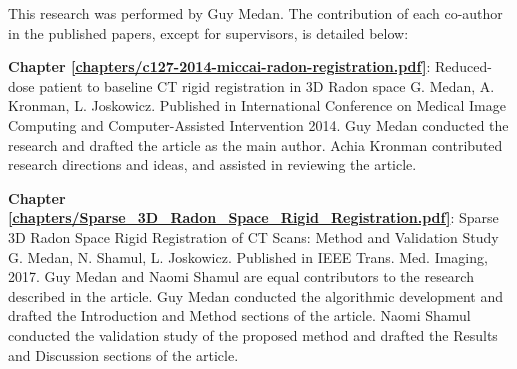 \cleardoublepage


\begin{contributions}

This research was performed by Guy Medan. The contribution of each co-author in the published papers, except for supervisors, is detailed below:

\textbf{Chapter \ref{chapters/c127-2014-miccai-radon-registration.pdf}}: Reduced-dose patient to baseline CT rigid registration in 3D Radon space
\newline
G. Medan, A. Kronman, L. Joskowicz. Published in International Conference on Medical Image Computing and Computer-Assisted Intervention 2014.
\newline
Guy Medan conducted the research and drafted the article as the main author. Achia Kronman contributed research directions and ideas, and assisted in reviewing the article.

\textbf{Chapter \ref{chapters/Sparse_3D_Radon_Space_Rigid_Registration.pdf}}: Sparse 3D Radon Space Rigid Registration of CT Scans: Method and Validation Study
\newline
G. Medan, N. Shamul, L. Joskowicz. Published in IEEE Trans. Med. Imaging, 2017.
\newline
Guy Medan and Naomi Shamul are equal contributors to the research described in the article.
Guy Medan conducted the algorithmic development and drafted the Introduction and Method sections of the article. 
Naomi Shamul conducted the validation study of the proposed method and drafted the Results and Discussion sections of the article.

\end{contributions}